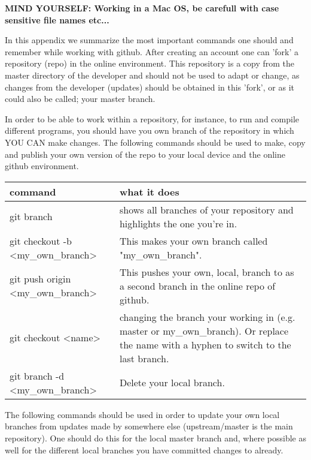 \textbf{MIND YOURSELF: Working in a Mac OS, be carefull with case sensitive file names etc...}

In this appendix we summarize the most important commands one should and remember while working with github. After creating an account one can 'fork' a repository (repo) in the online environment. This repository is a copy from the master directory of the developer and should not be used to adapt or change, as changes from the developer (updates) should be obtained in this 'fork', or as it could also be called; your master branch. 
  
In order to be able to work within a repository, for instance, to run and compile different programs, you should have you own branch of the repository in which YOU CAN make changes. The following commands should be used to make, copy and publish your own version of the repo to your local device and the online github environment.

\begin{center}
\begin{tabular}{l|l}
\textbf{command} &  \textbf{what it does} \\
\hline
  git branch & shows all branches of your repository and highlights the one you're in. \\
  git checkout -b \textless my\_own\_branch\textgreater & This makes your own branch called "my\_own\_branch". \\
  git push origin \textless my\_own\_branch\textgreater & This pushes your own, local, branch to as a second branch in the online repo of github. \\
  git checkout \textless name\textgreater & changing the branch your working in (e.g. master or my\_own\_branch). Or replace the name with a hyphen to switch to the last branch.\\
  git branch -d \textless my\_own\_branch\textgreater & Delete your local branch. \\
  \end{tabular}
\end{center}
  

  The following commands should be used in order to update your own local branches from updates made by somewhere else (upstream/master is the main repository). One should do this for the local master branch and, where possible as well for the different local branches you have committed changes to already. 

